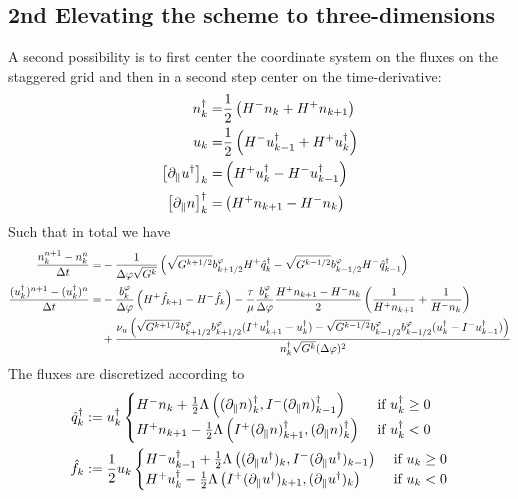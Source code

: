 \subsection{2nd Elevating the scheme to three-dimensions}
A second possibility is to first center the coordinate system on the fluxes on the staggered grid and then
in a second step center on the time-derivative:
\begin{align}
n_k^\dagger =& \frac{1}{2}\left( H^- n_k + H^+ n_{k+1}\right) \\
u_k =& \frac{1}{2}\left( H^- u^\dagger_{k-1} + H^+ u_{k}^\dagger\right)\\
\left[\partial_\parallel u^\dagger \right]_k =& \left( H^+ u^\dagger_{k} - H^-
u^\dagger_{k-1}\right) \\
\left[\partial_\parallel n\right]^\dagger_k =& \left( H^+ n_{k+1} - H^-
n_k\right)
\end{align}
Such that in total we have
\begin{align}
    \frac{n_k^{n+1} - n_k^n}{\Delta t} = &-\frac{1}{\Delta\varphi \sqrt{G^k}}
    \left( \sqrt{G^{k+1/2}}b^\varphi_{k+1/2}  H^+ \hat q_{k}^\dagger
    -\sqrt{G^{k-1/2}}b^\varphi_{k-1/2}  H^- \hat q_{k-1}^\dagger \right)
     \\
    \frac{(u_k^\dagger)^{n+1}-(u_k^\dagger)^{n}}{\Delta t} = &-
 \frac{b^\varphi_k}{\Delta\varphi}\left( H^+\hat f_{k+1} - H^-\hat f_k\right)
 -\frac{\tau}{\mu}\frac{b^\varphi_k}{\Delta\varphi} \frac{H^+ n_{k+1} - H^- n_k}{2}\left( \frac{1}{H^+ n_{k+1}} + \frac{1}{H^- n_k} \right)
    \nonumber\\
    &+ \frac{\nu_u
        \left(\sqrt{G^{k+1/2}}b^\varphi_{k+1/2}b^\varphi_{k+1/2} (I^+ u^\dagger_{k+1} - u^\dagger_k)
        - \sqrt{G^{k-1/2}}b^\varphi_{k-1/2}b^\varphi_{k-1/2} ( u^\dagger_k - I^- u^\dagger_{k-1})\right)
    }{n^\dagger_{k} \sqrt{G^k}(\Delta \varphi)^2}
\end{align}
The fluxes are discretized according to
\begin{align}
    \hat q^\dagger_k &:= u^\dagger_k \begin{cases}
        H^- n_k     + \frac{1}{2}\Lambda\left( (\partial_\parallel n)^\dagger_k, I^- (\partial_\parallel n)^\dagger_{k-1}\right)&\text{ if } u^\dagger_k \geq 0 \\
        H^+ n_{k+1} - \frac{1}{2}\Lambda\left( I^+(\partial_\parallel n)^\dagger_{k+1}, (\partial_\parallel n)^\dagger_k\right) &\text{ if } u^\dagger_k < 0
    \end{cases}
    \\
    \hat f_k &:= \frac{1}{2}u_k\begin{cases}
        H^- u^\dagger_{k-1} + \frac{1}{2}\Lambda\left( (\partial_\parallel u^\dagger )_k, I^- (\partial_\parallel u^\dagger)_{k-1}\right)&\text{ if } u_k \geq 0 \\
        H^+ u^\dagger_{k}   - \frac{1}{2}\Lambda\left( I^+(\partial_\parallel u^\dagger)_{k+1}, (\partial_\parallel u^\dagger)_k\right) &\text{ if } u_k < 0 \\
    \end{cases}
\end{align}


